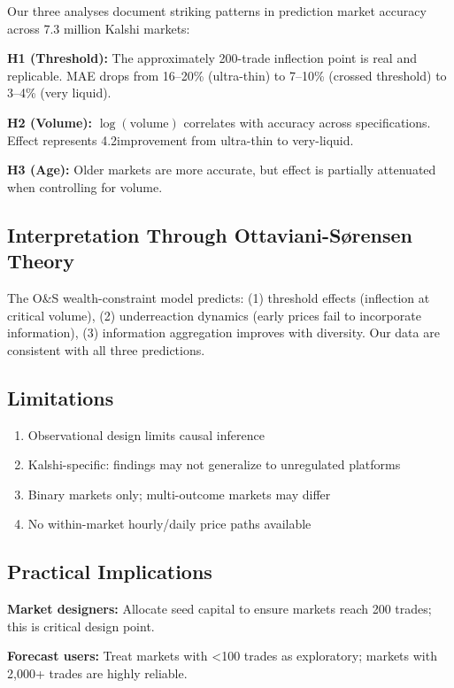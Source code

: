 \documentclass[a4paper,11pt]{article}
\theoremstyle{plain}
\theoremstyle{definition}
\begin{document}
Our three analyses document striking patterns in prediction market accuracy across 7.3 million Kalshi markets:

\textbf{H1 (Threshold):} The approximately 200-trade inflection point is real and replicable. MAE drops from 16--20\% (ultra-thin) to 7--10\% (crossed threshold) to 3--4\% (very liquid).

\textbf{H2 (Volume):} $\log(\text{volume})$ correlates with accuracy across specifications. Effect represents 4.2\times improvement from ultra-thin to very-liquid.

\textbf{H3 (Age):} Older markets are more accurate, but effect is partially attenuated when controlling for volume.

\subsection{Interpretation Through Ottaviani-Sørensen Theory}

The O&S wealth-constraint model predicts: (1) threshold effects (inflection at critical volume), (2) underreaction dynamics (early prices fail to incorporate information), (3) information aggregation improves with diversity. Our data are consistent with all three predictions.

\subsection{Limitations}

\begin{enumerate}
\item Observational design limits causal inference
\item Kalshi-specific: findings may not generalize to unregulated platforms
\item Binary markets only; multi-outcome markets may differ
\item No within-market hourly/daily price paths available
\end{enumerate}

\subsection{Practical Implications}

\textbf{Market designers:} Allocate seed capital to ensure markets reach 200 trades; this is critical design point.

\textbf{Forecast users:} Treat markets with <100 trades as exploratory; markets with 2,000+ trades are highly reliable.
\end{document}
